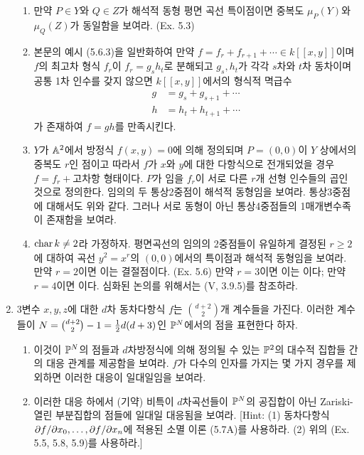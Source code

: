 \begin{enumerate}[label=\tb{5.\arabic*.},itemindent=0mm,itemsep=4mm]
	\begin{enumerate}[label=(\alph*)]
	\item 만약 $P\in Y$와 $Q\in Z$가 해석적 동형 평면 곡선 특이점이면 중복도 $\mu_P(Y)$와 $\mu_Q(Z)$가 동일함을 보여라. (Ex. 5.3)
	\item 본문의 예시 (5.6.3)을 일반화하여 만약 $f=f_r+f_{r+1}+\cdots\in k[[x,y]]$이며
	$f$의 최고차 형식 $f_r$이 $f_r=g_sh_t$로 분해되고 $g_s,h_t$가 각각 $s$차와 $t$차 동차이며
	공통 1차 인수를 갖지 않으면 $k[[x,y]]$에서의 형식적 멱급수
	\begin{align*}
	g&=g_s+g_{s+1}+\cdots\\h&=h_t+h_{t+1}+\cdots
	\end{align*}
	가 존재하여 $f=gh$를 만족시킨다.
	\item $Y$가 $\mathbb{A}^2$에서 방정식 $f(x,y)=0$에 의해 정의되며 $P=(0,0)$이 $Y$ 상에서의 중복도 $r$인 점이고
	따라서 $f$가 $x$와 $y$에 대한 다항식으로 전개되었을 경우 $f=f_r+$고차항 형태이다.
	$P$가 임을 $f_r$이 서로 다른 $r$개 선형 인수들의 곱인 것으로 정의한다.
	임의의 두 통상2중점이 해석적 동형임을 보여라. 통상3중점에 대해서도 위와 같다.
	그러나 서로 동형이 아닌 통상4중점들의 1매개변수족이 존재함을 보여라.
	\end{enumerate}
		\begin{enumerate}[label=*(\alph*)]
			\setcounter{enumii}{3}
			\item $\operatorname{char} k\ne 2$라 가정하자. 평면곡선의 임의의 2중점들이 유일하게 결정된 $r\ge 2$에 대하여
			곡선 $y^2=x^r$의 $(0,0)$에서의 특이점과 해석적 동형임을 보여라.
			만약 $r=2$이면 이는 결절점이다. (Ex. 5.6) 만약 $r=3$이면 이는 이다;
			만약 $r=4$이면 이다. 심화된 논의를 위해서는 (V, 3.9.5)를 참조하라.
		\end{enumerate}
		\item {} 3변수 $x,y,z$에 대한 $d$차 동차다항식 $f$는 $\binom{d+2}2$개 계수들을 가진다.
		이러한 계수들이 $N=\binom{d+2}2-1=\frac{1}{2}d(d+3)$인 $\mathbb{P}^N$에서의 점을 표현한다 하자.
		\begin{enumerate}[label=(\alph*)]
			\item 이것이 $\mathbb{P}^N$의 점들과 $d$차방정식에 의해 정의될 수 있는 $\mathbb{P}^2$의 대수적 집합들 간의 대응 관계를 제공함을 보여라.
			$f$가 다수의 인자를 가지는 몇 가지 경우를 제외하면 이러한 대응이 일대일임을 보여라.
			\item 이러한 대응 하에서 (기약) 비특이 $d$차곡선들이 $\mathbb{P}^N$의 공집합이 아닌 Zariski-열린 부분집합의 점들에
			일대일 대응됨을 보여라. [Hint: (1) 동차다항식 $\partial f/\partial x_0,\ldots,\partial f/\partial x_n$에 적용된 소멸 이론 (5.7A)를 사용하라.
			(2) 위의 (Ex. 5.5, 5.8, 5.9)를 사용하라.]
		\end{enumerate}
	\end{enumerate}
	
